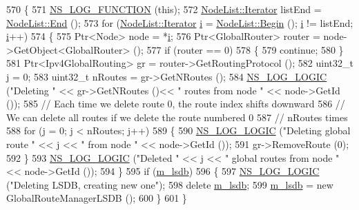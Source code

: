 \begin{DoxyCode}
570 \{
571   \hyperlink{log-macros-disabled_8h_a90b90d5bad1f39cb1b64923ea94c0761}{NS\_LOG\_FUNCTION} (\textcolor{keyword}{this});
572   \hyperlink{classns3_1_1NodeList_a9e2679a94efb4f0066cc21e65440364d}{NodeList::Iterator} listEnd = \hyperlink{classns3_1_1NodeList_a027a558c16e6078e25c7ffc67becb559}{NodeList::End} ();
573   \textcolor{keywordflow}{for} (\hyperlink{classns3_1_1NodeList_a9e2679a94efb4f0066cc21e65440364d}{NodeList::Iterator} \hyperlink{bernuolliDistribution_8m_a6f6ccfcf58b31cb6412107d9d5281426}{i} = \hyperlink{classns3_1_1NodeList_a93d2211831f5cb71d1dbb721e2721d7f}{NodeList::Begin} (); 
      \hyperlink{bernuolliDistribution_8m_a6f6ccfcf58b31cb6412107d9d5281426}{i} != listEnd; \hyperlink{bernuolliDistribution_8m_a6f6ccfcf58b31cb6412107d9d5281426}{i}++)
574     \{
575       Ptr<Node> node = *\hyperlink{bernuolliDistribution_8m_a6f6ccfcf58b31cb6412107d9d5281426}{i};
576       Ptr<GlobalRouter> router = node->GetObject<GlobalRouter> ();
577       \textcolor{keywordflow}{if} (router == 0)
578         \{
579           \textcolor{keywordflow}{continue};
580         \}
581       Ptr<Ipv4GlobalRouting> gr = router->GetRoutingProtocol ();
582       uint32\_t j = 0;
583       uint32\_t nRoutes = gr->GetNRoutes ();
584       \hyperlink{group__logging_ga88acd260151caf2db9c0fc84997f45ce}{NS\_LOG\_LOGIC} (\textcolor{stringliteral}{"Deleting "} << gr->GetNRoutes ()<< \textcolor{stringliteral}{" routes from node "} << node->GetId ());
585       \textcolor{comment}{// Each time we delete route 0, the route index shifts downward}
586       \textcolor{comment}{// We can delete all routes if we delete the route numbered 0}
587       \textcolor{comment}{// nRoutes times}
588       \textcolor{keywordflow}{for} (j = 0; j < nRoutes; j++)
589         \{
590           \hyperlink{group__logging_ga88acd260151caf2db9c0fc84997f45ce}{NS\_LOG\_LOGIC} (\textcolor{stringliteral}{"Deleting global route "} << j << \textcolor{stringliteral}{" from node "} << node->GetId ());
591           gr->RemoveRoute (0);
592         \}
593       \hyperlink{group__logging_ga88acd260151caf2db9c0fc84997f45ce}{NS\_LOG\_LOGIC} (\textcolor{stringliteral}{"Deleted "} << j << \textcolor{stringliteral}{" global routes from node "}<< node->GetId ());
594     \}
595   \textcolor{keywordflow}{if} (\hyperlink{classns3_1_1GlobalRouteManagerImpl_a7e528f818fa3e6c794b07c0b3cba5f61}{m\_lsdb})
596     \{
597       \hyperlink{group__logging_ga88acd260151caf2db9c0fc84997f45ce}{NS\_LOG\_LOGIC} (\textcolor{stringliteral}{"Deleting LSDB, creating new one"});
598       \textcolor{keyword}{delete} \hyperlink{classns3_1_1GlobalRouteManagerImpl_a7e528f818fa3e6c794b07c0b3cba5f61}{m\_lsdb};
599       \hyperlink{classns3_1_1GlobalRouteManagerImpl_a7e528f818fa3e6c794b07c0b3cba5f61}{m\_lsdb} = \textcolor{keyword}{new} GlobalRouteManagerLSDB ();
600     \}
601 \}
\end{DoxyCode}


